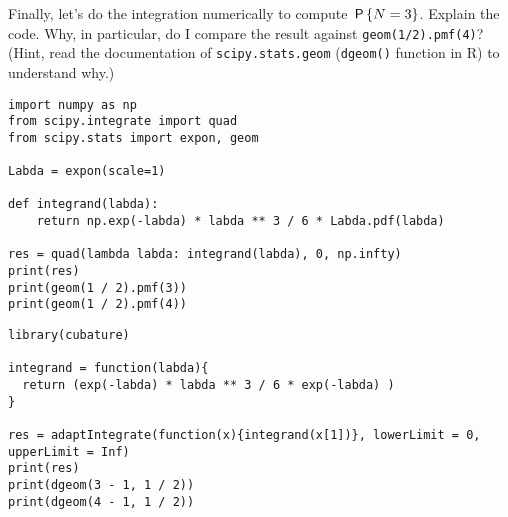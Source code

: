 \begin{exercise}
Finally, let's do the integration numerically to compute $\P{N=3}$. Explain the code. Why, in particular, do I compare the result against \texttt{geom(1/2).pmf(4)}? (Hint, read the documentation of \texttt{scipy.stats.geom} (\texttt{dgeom()} function in R) to understand why.)
\begin{verbatim}
import numpy as np
from scipy.integrate import quad
from scipy.stats import expon, geom

Labda = expon(scale=1)

def integrand(labda):
    return np.exp(-labda) * labda ** 3 / 6 * Labda.pdf(labda)

res = quad(lambda labda: integrand(labda), 0, np.infty)
print(res)
print(geom(1 / 2).pmf(3))
print(geom(1 / 2).pmf(4))
\end{verbatim}

\begin{verbatim}
library(cubature)  

integrand = function(labda){
  return (exp(-labda) * labda ** 3 / 6 * exp(-labda) )
}

res = adaptIntegrate(function(x){integrand(x[1])}, lowerLimit = 0, upperLimit = Inf)
print(res)
print(dgeom(3 - 1, 1 / 2))
print(dgeom(4 - 1, 1 / 2))
\end{verbatim}

\end{exercise}






